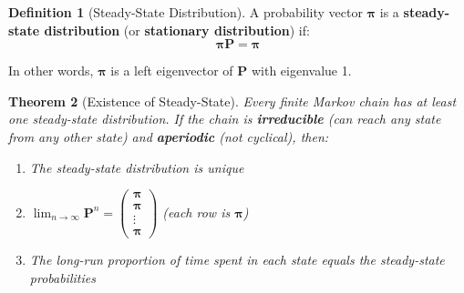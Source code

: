 \documentclass[12pt]{article}
\numberwithin{equation}{section}
\newcommand{\vect}[1]{\boldsymbol{#1}}   %
\newcommand{\mat}[1]{\mathbf{#1}}        %
\theoremstyle{plain}
\newtheorem{theorem}{Theorem}[section]
\theoremstyle{definition}
\newtheorem{definition}[theorem]{Definition}
\theoremstyle{remark}
\begin{document}
\begin{definition}[Steady-State Distribution]
A probability vector $\vect{\pi}$ is a \textbf{steady-state distribution} (or \textbf{stationary distribution}) if:
$$\vect{\pi}\mat{P} = \vect{\pi}$$

In other words, $\vect{\pi}$ is a left eigenvector of $\mat{P}$ with eigenvalue 1.
\end{definition}

\begin{theorem}[Existence of Steady-State]
Every finite Markov chain has at least one steady-state distribution. If the chain is \textbf{irreducible} (can reach any state from any other state) and \textbf{aperiodic} (not cyclical), then:
\begin{enumerate}
\item The steady-state distribution is unique
\item $\lim_{n \to \infty} \mat{P}^n = \begin{pmatrix} \vect{\pi} \\ \vect{\pi} \\ \vdots \\ \vect{\pi} \end{pmatrix}$ (each row is $\vect{\pi}$)
\item The long-run proportion of time spent in each state equals the steady-state probabilities
\end{enumerate}
\end{theorem}
\end{document}
